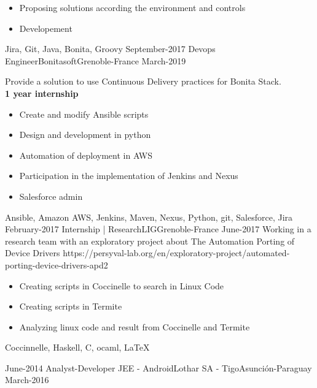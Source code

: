 \begin{experiences}
{\begin{itemize}
                          \item Proposing solutions according the environment and controls
                          \item Developement
                       \end{itemize}
                  }
                      {Jira, Git, Java, Bonita, Groovy}
  \emptySeparator
  \experience
    {September-2017}   {Devops Engineer}{Bonitasoft}{Grenoble-France}
    {March-2019}
                    {Provide a solution to use Continuous Delivery practices for Bonita Stack. \\
                    \textbf{\small 1 year internship}
                    \begin{itemize}
                        \item Create and modify Ansible scripts
                        \item Design and development in python
                        \item Automation of deployment in AWS
                        \item Participation in the implementation of Jenkins and Nexus
                        \item Salesforce admin
                      \end{itemize}}
                    {Ansible, Amazon AWS, Jenkins, Maven, Nexus, Python, git, Salesforce, Jira}
  \emptySeparator
    \projectexperiences
    {February-2017}   {Internship | Research}{LIG}{Grenoble-France}
    {June-2017}
                    {Working in a research team with an exploratory project about The Automation Porting of Device Drivers \tiny{https://persyval-lab.org/en/exploratory-project/automated-porting-device-drivers-apd2}}
                    {
                    \begin{itemize}
                        \item Creating scripts in Coccinelle to search in Linux Code
                        \item Creating scripts in Termite
                        \item Analyzing linux code and result from Coccinelle and Termite
                      \end{itemize}
                     }
                    {Coccinnelle, Haskell, C, ocaml, \LaTeX}
  \emptySeparator

  \projectexperiences
    {June-2014}   {Analyst-Developer JEE - Android}{Lothar SA - Tigo}{Asunción-Paraguay}
    {March-2016} {

}
\end{experiences}
